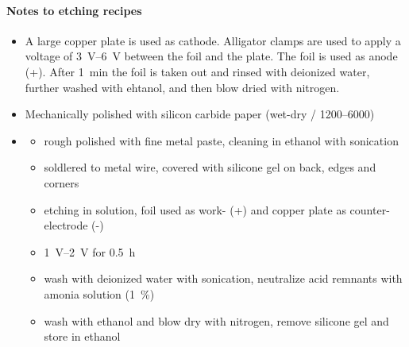 \paragraph{Notes to etching recipes}
 \begin{itemize}
  \item[\cite{bin_zhang_low-temperature_2012}] A large copper plate is used as cathode. Alligator clamps are used to apply a voltage of \SIrange{3}{6}{\volt} between the foil and the plate. The foil is used as anode (+). After \SI{1}{\minute} the foil is taken out and rinsed with deionized water, further washed with ehtanol, and then blow dried with nitrogen.
  \item[\cite{stables_report_2008}] Mechanically polished with silicon carbide paper (wet-dry / \SIrange{1200}{6000}{})
  \item[\cite{luo_effect_2011}]
    \begin{itemize}
       \item rough polished with fine metal paste, cleaning in ethanol with sonication 
       \item soldlered to metal wire, covered with silicone gel on back, edges and corners
       \item etching in solution, foil used as work- (+) and copper plate as counter-electrode (-) 
       \item \SIrange{1}{2}{\volt} for \SI{0.5}{\hour} 
       \item wash with deionized water with sonication, neutralize acid remnants with amonia solution (\SI{1}{\percent})
       \item wash with ethanol and blow dry with nitrogen, remove silicone gel and store in ethanol
    \end{itemize}
 \end{itemize}


